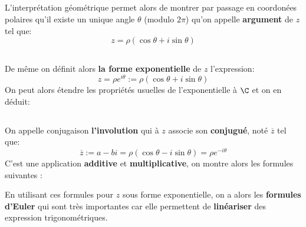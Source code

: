 \subsection*{}
L'interprétation géométrique permet alors de montrer par passage en coordonées polaires qu'il existe un unique angle \(\theta\) (modulo \(2\pi\)) qu'on appelle \textbf{argument} de \(z\) tel que:
\[
    z = \rho(\cos\theta+i\sin\theta)   
\]

\subsection*{}
De même on définit alors \textbf{la forme exponentielle} de \(z\) l'expression:
\[
    z = \rho e^{i\theta} := \rho(\cos\theta+i\sin\theta)
\]
On peut alors étendre les propriétés usuelles de l'exponentielle à \(\C\) et on en déduit:

\subsection*{}
On appelle conjugaison \textbf{l'involution} qui à \(z\) associe son \textbf{conjugué}, noté \(\overline{z}\) tel que:
\[
    \overline{z} := a - bi = \rho(\cos\theta - i\sin\theta) = \rho e^{-i\theta}
\]
C'est une application \textbf{additive} et \textbf{multiplicative}, on montre alors les formules suivantes {:}

En utilisant ces formules pour \(z\) sous forme exponentielle, on a alors les \textbf{formules d'Euler} qui sont très importantes car elle permettent de \textbf{linéariser} des expression trigonométriques.\<

